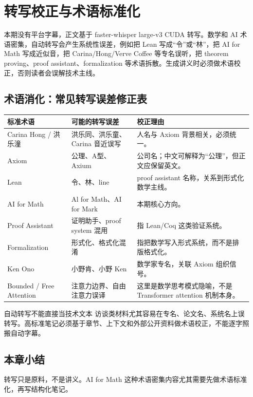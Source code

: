 \section{转写校正与术语标准化}

本期没有平台字幕，正文基于 faster-whisper large-v3 CUDA 转写。数学和 AI 术语密集，自动转写会产生系统性误差，例如把 Lean 写成“令”或“林”，把 AI for Math 写成近似音，把 Carina/Hong/Verve Coffee 等专名误听，把 theorem proving、proof assistant、formalization 等术语拆散。生成讲义时必须做术语校正，否则读者会误解技术主线。

\subsection{术语消化：常见转写误差修正表}

\noindent\begin{longtable}{p{}p{}p{}}
\toprule
标准术语 & 可能的转写误差 & 校正理由 \\
\midrule
Carina Hong / 洪乐潼 & 洪乐同、洪乐童、Carina 音近误写 & 人名与 Axiom 背景相关，必须统一。 \\
Axiom & 公理、A型、Axium & 公司名；中文可解释为“公理”，但正文应保留英文。 \\
Lean & 令、林、line & proof assistant 名称，关系到形式化数学主线。 \\
AI for Math & Al for Math、AI for Mark & 本期核心方向。 \\
Proof Assistant & 证明助手、proof system 混用 & 指 Lean/Coq 这类验证系统。 \\
Formalization & 形式化、格式化混淆 & 指把数学写入形式系统，而不是排版格式化。 \\
Ken Ono & 小野肯、小野 Ken & 数学家专名，关联 Axiom 组织信号。 \\
Bounded / Free Attention & 注意力边界、自由注意力误译 & 这里是数学思考模式隐喻，不是 Transformer attention 机制本身。 \\
\bottomrule
\end{longtable}

\begin{warningbox}{自动转写不能直接当技术文本}
访谈类材料尤其容易在专名、论文名、系统名上误转写。高标准笔记必须基于章节、上下文和外部公开资料做术语校正，不能逐字照搬自动字幕。
\end{warningbox}

\subsection{本章小结}

转写只是原料，不是讲义。AI for Math 这种术语密集内容尤其需要先做术语标准化，再写结构化笔记。

